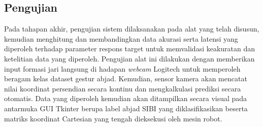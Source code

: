 \subsection{Pengujian}
Pada tahapan akhir, pengujian sistem dilaksanakan pada alat yang telah disusun, kemudian menghitung dan membandingkan data akurasi serta latensi yang diperoleh terhadap parameter respons target untuk memvalidasi keakuratan dan ketelitian data yang diperoleh. Pengujian alat ini dilakukan dengan memberikan input formasi jari langsung di hadapan \textit{webcam} Logitech untuk memperoleh beragam kelas dataset gestur abjad. Kemudian, sensor kamera akan mencatat nilai koordinat persendian secara kontinu dan mengkalkulasi prediksi secara otomatis. Data yang diperoleh kemudian akan ditampilkan secara visual pada antarmuka GUI Tkinter berupa label abjad SIBI yang diklasifikasikan beserta matriks koordinat Cartesian yang tengah dieksekusi oleh mesin robot.
